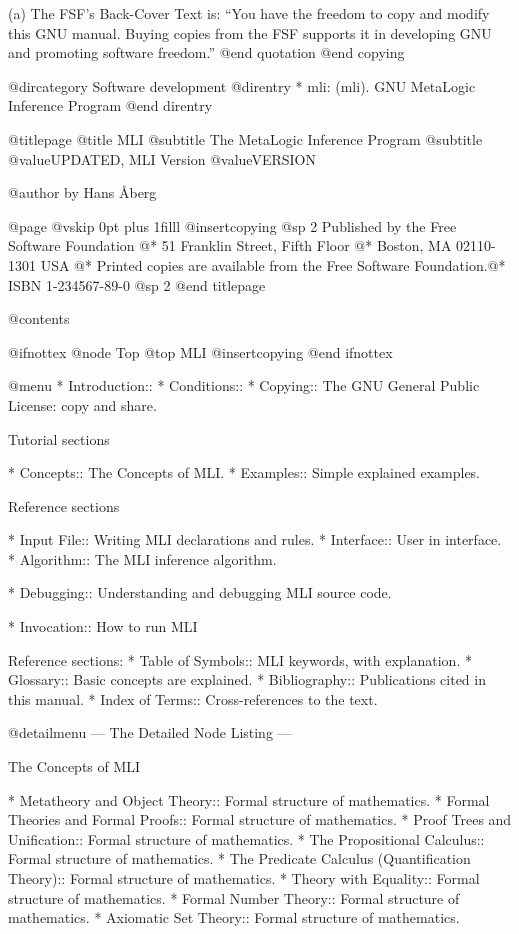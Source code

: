 (a) The FSF's Back-Cover Text is: ``You have the freedom to copy and
modify this GNU manual.  Buying copies from the FSF
supports it in developing GNU and promoting software
freedom.''
@end quotation
@end copying

@dircategory Software development
@direntry
* mli: (mli).       GNU MetaLogic Inference Program
@end direntry

@titlepage
@title MLI
@subtitle The MetaLogic Inference Program
@subtitle @value{UPDATED}, MLI Version @value{VERSION}

@author by Hans Åberg

@page
@vskip 0pt plus 1filll
@insertcopying
@sp 2
Published by the Free Software Foundation @*
51 Franklin Street, Fifth Floor @*
Boston, MA  02110-1301  USA @*
Printed copies are available from the Free Software Foundation.@*
ISBN 1-234567-89-0
@sp 2
@end titlepage

@contents

@ifnottex
@node Top
@top MLI
@insertcopying
@end ifnottex

@menu
* Introduction::
* Conditions::
* Copying::         The GNU General Public License: copy and share.


Tutorial sections

* Concepts::      The Concepts of MLI.
* Examples::      Simple explained examples.

Reference sections

* Input File::    Writing MLI declarations and rules.
* Interface::     User in interface.
* Algorithm::     The MLI inference algorithm.

* Debugging::     Understanding and debugging MLI source code.

* Invocation::    How to run MLI


Reference sections:
* Table of Symbols::    MLI keywords, with explanation.
* Glossary::            Basic concepts are explained.
* Bibliography::        Publications cited in this manual.
* Index of Terms::      Cross-references to the text.


@detailmenu
 --- The Detailed Node Listing ---

The Concepts of MLI

* Metatheory and Object Theory:: Formal structure of mathematics.
* Formal Theories and Formal Proofs:: Formal structure of mathematics.
* Proof Trees and Unification:: Formal structure of mathematics.
* The Propositional Calculus:: Formal structure of mathematics.
* The Predicate Calculus (Quantification Theory):: Formal structure of mathematics.
* Theory with Equality:: Formal structure of mathematics.
* Formal Number Theory:: Formal structure of mathematics.
* Axiomatic Set Theory:: Formal structure of mathematics.

